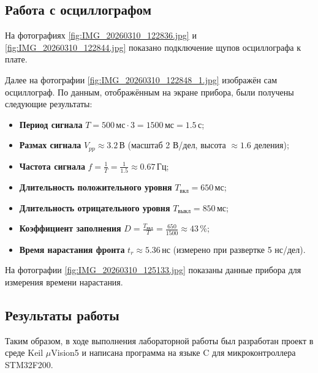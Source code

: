 \subsection*{Работа с осциллографом}

На фотографиях \ref{fig:IMG_20260310_122836.jpg} и \ref{fig:IMG_20260310_122844.jpg} показано подключение щупов осциллографа к плате.


Далее на фотографии \ref{fig:IMG_20260310_122848_1.jpg} изображён сам осциллограф.
По данным, отображённым на экране прибора, были получены следующие результаты:


\begin{itemize}
    \item \textbf{Период сигнала} $T = 500\,\text{мс} \cdot 3 = 1500\,\text{мс} = 1.5\,\text{с}$;
    \item \textbf{Размах сигнала} $V_{pp} \approx 3.2\,\text{В}$ (масштаб 2 В/дел, высота $\approx 1.6$ деления);
    \item \textbf{Частота сигнала} $f = \frac{1}{T} = \frac{1}{1.5} \approx 0.67\,\text{Гц}$;
    \item \textbf{Длительность положительного уровня} $T_{\text{вкл}} = 650\,\text{мс}$;
    \item \textbf{Длительность отрицательного уровня} $T_{\text{выкл}} = 850\,\text{мс}$;
    \item \textbf{Коэффициент заполнения} $D = \frac{T_{\text{вкл}}}{T} = \frac{650}{1500} \approx 43\,\%$;
    \item \textbf{Время нарастания фронта} $t_r \approx 5.36\,\text{нс}$ (измерено при развертке 5 нс/дел).
\end{itemize}

На фотографии \ref{fig:IMG_20260310_125133.jpg} показаны данные прибора для измерения времени нарастания.

\subsection*{Результаты работы}

Таким образом, в ходе выполнения лабораторной работы был разработан проект в среде Keil $\mu$Vision5 и написана программа на языке C для микроконтроллера STM32F200.


